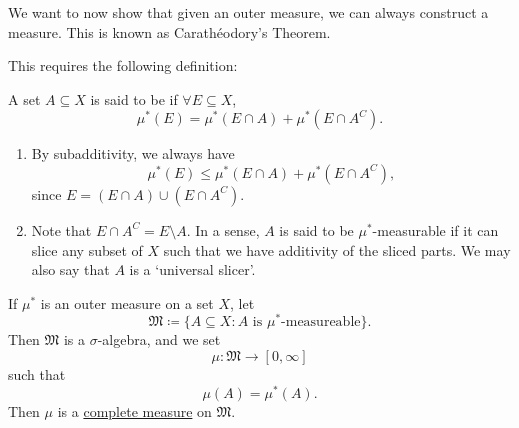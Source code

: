 \documentclass[notoc,notitlepage]{tufte-book}
\begin{document}
We want to now show that given an outer measure,
we can always construct a measure.
This is known as Carathéodory's Theorem.

This requires the following definition:

\begin{defn}[$\mu^*$-measurability]\label{defn:_mu_star_measurability}
  A set $A \subseteq X$ is said to be 
  if $\forall E \subseteq X$,
  \begin{equation*}
    \mu^*(E) = \mu^*(E \cap A) + \mu^*(E \cap A^C).
  \end{equation*}
\end{defn}

\begin{remark}
  \begin{enumerate}
    \item By subadditivity, we always have
      \begin{equation*}
        \mu^*(E) \leq \mu^*(E \cap A) + \mu^*(E \cap A^C),
      \end{equation*}
      since $E = (E \cap A) \cup (E \cap A^C)$.
    \item Note that $E \cap A^C = E \setminus A$.
      In a sense, $A$ is said to be $\mu^*$-measurable
      if it can slice any subset of $X$ such that we have
      additivity of the sliced parts.
      We may also say that $A$ is a `universal slicer'.
  \end{enumerate}
\end{remark}

\begin{thm}\label{thm:caratheodory_s_theorem}
  If $\mu^*$ is an outer measure on a set $X$, let
  \begin{equation*}
    \mathfrak{M} \coloneqq \{ A \subseteq X
      : A \text{ is } \mu^*\text{-measureable} \}.
  \end{equation*}
  Then $\mathfrak{M}$ is a $\sigma$-algebra, and we set
  \begin{equation*}
    \mu : \mathfrak{M} \to [0, \infty]
  \end{equation*}
  such that
  \begin{equation*}
    \mu(A) = \mu^*(A).
  \end{equation*}
  Then $\mu$ is a \hyperref[defn:complete_measure_space]{complete measure}
  on $\mathfrak{M}$.
\end{thm}

\end{document}
